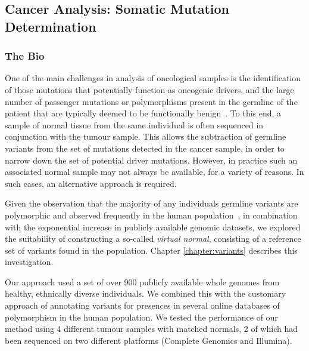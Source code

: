 \subsection{Cancer Analysis: Somatic Mutation Determination}
\subsubsection{The Bio}
One of the main challenges in analysis of oncological samples is the identification of those mutations that potentially function as oncogenic drivers, and the large number of passenger mutations or polymorphisms present in the germline of the patient that are typically deemed to be functionally benign~\cite{lawrence2013mutational}. To this end, a sample of normal tissue from the same individual is often sequenced in conjunction with the tumour sample. This allows the subtraction of germline variants from the set of mutations detected in the cancer sample, in order to narrow down the set of potential driver mutations. However, in practice such an associated normal sample may not always be available, for a variety of reasons. In such cases, an alternative approach is required.

Given the observation that the majority of any individuals germline variants are polymorphic and observed frequently in the human population~\cite{TODO}, in combination with the exponential increase in publicly available genomic datasets, we explored the suitability of constructing a so-called \emph{virtual normal}, consisting of a reference set of variants found in the population. Chapter \ref{chapter:variants} describes this investigation.

Our approach used a set of over 900 publicly available whole genomes from healthy, ethnically diverse individuals. We combined this with the customary approach of annotating variants for presences in several online databases of polymorphism in the human population. We tested the performance of our method using 4 different tumour samples with matched normals, 2 of which had been sequenced on two different platforms (Complete Genomics and Illumina).

